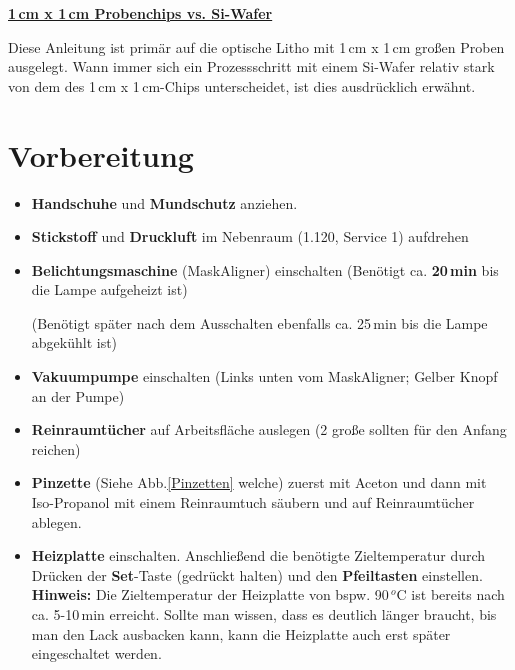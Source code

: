 \documentclass[
  ngerman,
  twoside,
  captions=tableheading,
  BCOR=.5cm,
  fontsize=11,
  ]{scrreprt}
\begin{document}
\bigskip

\begin{center}
\underline{\textbf{1\,cm x 1\,cm Probenchips vs. Si-Wafer}}
\end{center}

Diese Anleitung ist primär auf die optische Litho mit 1\,cm x 1\,cm großen Proben ausgelegt. Wann immer sich ein Prozessschritt mit einem Si-Wafer relativ stark von dem des 1\,cm x 1\,cm-Chips unterscheidet, ist dies ausdrücklich erwähnt.


\chapter{Vorbereitung}
\begin{itemize}
\item \textbf{Handschuhe} und \textbf{Mundschutz} anziehen.
\item \textbf{Stickstoff} und \textbf{Druckluft} im Nebenraum (1.120, Service 1) aufdrehen
\item \textbf{Belichtungsmaschine} (MaskAligner) einschalten (Benötigt ca. \textbf{20\,min} bis die Lampe aufgeheizt ist)

(Benötigt später nach dem Ausschalten ebenfalls ca. 25\,min bis die Lampe abgekühlt ist)

\item \textbf{Vakuumpumpe} einschalten (Links unten vom MaskAligner; Gelber Knopf an der Pumpe)
\item \textbf{Reinraumtücher} auf Arbeitsfläche auslegen (2 große sollten für den Anfang reichen)
\item \textbf{Pinzette} (Siehe Abb.\ref{Pinzetten} welche) zuerst mit Aceton und dann mit Iso-Propanol mit einem Reinraumtuch säubern und auf Reinraumtücher ablegen.
\item \textbf{Heizplatte} einschalten. Anschließend die benötigte Zieltemperatur durch Drücken der \textbf{Set}-Taste (gedrückt halten) und den \textbf{Pfeiltasten} einstellen.\\

\textbf{Hinweis:} Die Zieltemperatur der Heizplatte von bspw. 90\,$^o$C ist bereits nach ca. 5-10\,min erreicht. Sollte man wissen, dass es deutlich länger braucht, bis man den Lack ausbacken kann, kann die Heizplatte auch erst später eingeschaltet werden.
\end{itemize}
\end{document}
